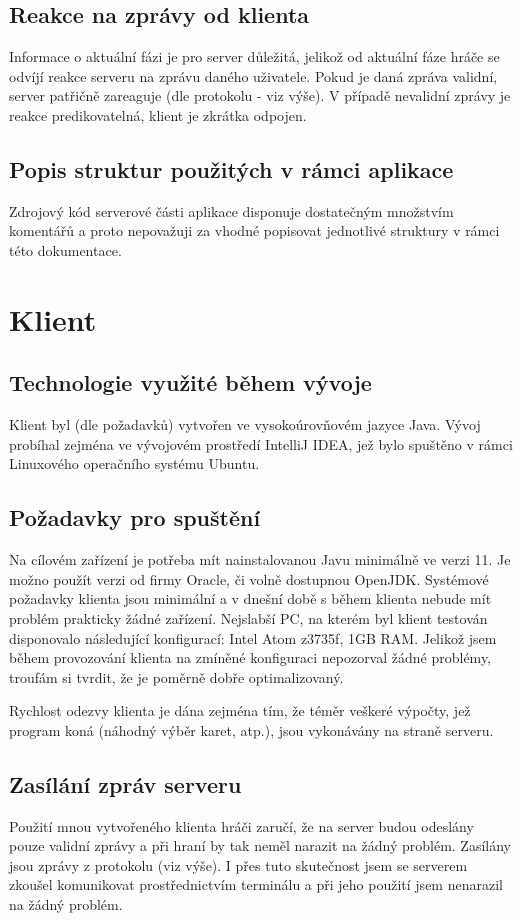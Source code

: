 \documentclass[12pt, a4paper, pdftex, czech, titlepage]{report}
\begin{document}
\subsection{Reakce na zprávy od klienta}
Informace o aktuální fázi je pro server důležitá,
jelikož od aktuální fáze hráče se odvíjí reakce serveru
na zprávu daného uživatele. Pokud je daná zpráva validní, 
server patřičně zareaguje (dle protokolu - viz výše).
V případě nevalidní zprávy je reakce predikovatelná, klient je zkrátka odpojen.

\subsection{Popis struktur použitých v rámci aplikace}
Zdrojový kód serverové části aplikace disponuje dostatečným množstvím komentářů a proto nepovažuji za
vhodné popisovat jednotlivé struktury v rámci této dokumentace.


\section{Klient}
\subsection{Technologie využité během vývoje}
Klient byl (dle požadavků) vytvořen ve vysokoúrovňovém jazyce Java.
Vývoj probíhal zejména ve vývojovém prostředí IntelliJ IDEA, jež bylo spuštěno v rámci Linuxového operačního
systému Ubuntu.

\subsection{Požadavky pro spuštění}
Na cílovém zařízení je potřeba mít nainstalovanou Javu minimálně ve verzi 11. Je možno použít verzi od firmy Oracle, či volně dostupnou OpenJDK. Systémové
požadavky klienta jsou minimální a v dnešní době s během klienta nebude mít problém prakticky žádné zařízení. Nejslabší PC, na kterém
byl klient testován disponovalo následující konfigurací: Intel Atom z3735f, 1GB RAM. Jelikož jsem během provozování klienta
na zmíněné konfiguraci nepozorval žádné problémy, troufám si tvrdit, že je poměrně dobře optimalizovaný.

Rychlost odezvy klienta je dána zejména tím, že téměr veškeré výpočty, jež program koná (náhodný výběr karet, atp.), jsou vykonávány na straně serveru.

\subsection{Zasílání zpráv serveru}
Použití mnou vytvořeného klienta hráči zaručí, že na server budou odeslány pouze validní zprávy a při hraní by tak neměl narazit na žádný problém.
Zasílány jsou zprávy z protokolu (viz výše). I přes tuto skutečnost jsem se serverem zkoušel komunikovat prostřednictvím terminálu a při jeho použití
jsem nenarazil na žádný problém.
\end{document}
